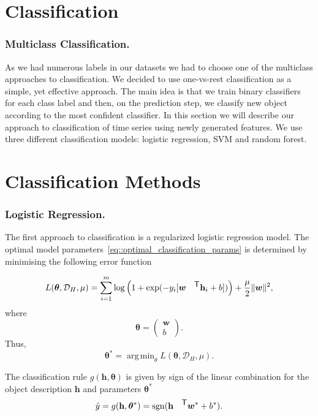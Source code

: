 \documentclass{llncs}
\DeclareMathOperator{\sgn}{\mathop{sgn}}
\DeclareMathOperator*{\argmin}{arg\,min}
\newcommand{\T}{{\mbox{\footnotesize\sffamily\upshape\mdseries T}}}
\begin{document}
\section{Classification}
\subsubsection{Multiclass Classification.}
As we had numerous labels in our datasets we had to choose one of the multiclass approaches to classification. 
We decided to use one-vs-rest classification as a simple, yet effective approach. The main idea is that we train binary classifiers for each class label and then, on the prediction step, we classify new object according to the most confident classifier.
In this section we will describe our approach to classification of time series using newly generated features. 
We use three different classification models: logistic regression, SVM and random forest.
\section{Classification Methods}
\subsubsection{Logistic Regression.}
The first approach to classification is a regularized logistic regression model. The optimal model parameters~\eqref{eq::optimal_classification_params} is determined by minimising the following error function

\begin{equation*}
L(\bm{\theta}, \mathcal{D}_H, \mu) = \sum_{i=1}^{m} \log\left(1 + \exp(-y_i [\bm{w}^{\T} \mathbf{h}_i + b])\right) + \frac{\mu}{2} \|\bm{w}\|^2,
\end{equation*}
where 
\begin{equation*}
\bm{\theta}  = \begin{pmatrix}
\bm{w} \\ b
\end{pmatrix}.
\end{equation*}
Thus, 
\begin{equation*}
\bm{\theta}^* = \argmin_{\mathbb{\theta}} L(\bm{\theta}, \mathcal{D}_H, \mu).
\end{equation*}

The classification rule $g(\mathbf{h}, \bm{\theta})$ is given by sign of the linear combination for the object description $\mathbf{h}$ and parameters $\bm{\theta}^*$
\begin{equation*}
\hat{y} = g(\mathbf{h}, \bm{\theta}^*) = \sgn(\mathbf{h}^{\T} \bm{w}^* + b^*).
\end{equation*}
\end{document}
